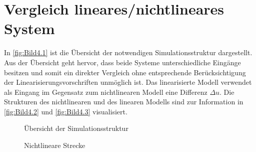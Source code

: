 \pagestyle{aaron}
\section{Vergleich lineares/nichtlineares System} \label{sec:Vergleich}

In \autoref{fig:Bild4.1} ist die Übersicht der notwendigen Simulationsstruktur dargestellt. Aus der Übersicht geht hervor, dass beide Systeme unterschiedliche Eingänge besitzen und somit ein direkter Vergleich ohne entsprechende Berücksichtigung der Linearisierungsvorschriften unmöglich ist. Das linearisierte Modell verwendet als Eingang im Gegensatz zum nichtlinearen Modell eine Differenz $\Delta u$. Die Strukturen des nichtlinearen und des linearen Modells sind zur Information in \autoref{fig:Bild4.2} und \autoref{fig:Bild4.3} visualisiert.

\begin{figure}[H]
   \centering
   \caption[Übersicht der Simulationsstruktur]{Übersicht der Simulationsstruktur}
   \label{fig:Bild4.1}
\end{figure}

\begin{figure}[H]
   \centering
   \caption[Nichtlineare Strecke]{Nichtlineare Strecke}
   \label{fig:Bild4.2}
\end{figure}

